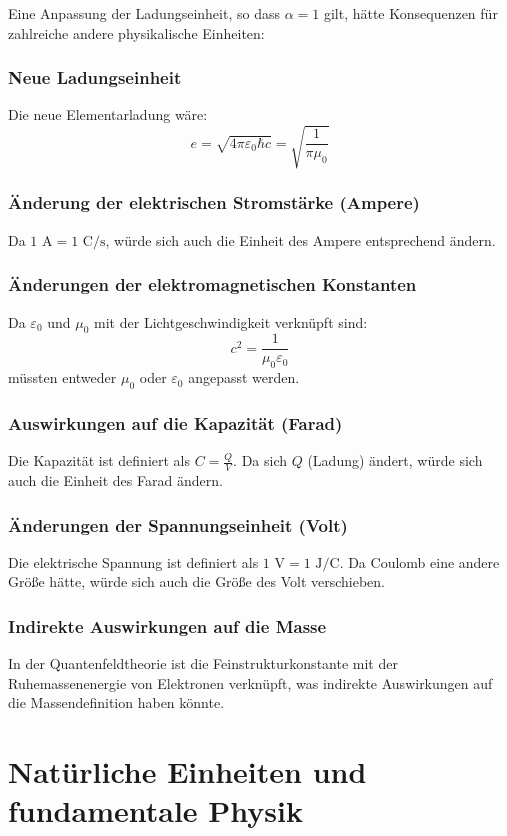 \documentclass{article}
\begin{document}
	Eine Anpassung der Ladungseinheit, so dass $\alpha = 1$ gilt, hätte Konsequenzen für zahlreiche andere physikalische Einheiten:
	
	\subsubsection{Neue Ladungseinheit}
	Die neue Elementarladung wäre:
	$$e = \sqrt{4\pi\varepsilon_0\hbar c} = \sqrt{\frac{1}{\pi \mu_0}}$$
	
	\subsubsection{Änderung der elektrischen Stromstärke (Ampere)}
	Da $1 \text{ A} = 1 \text{ C}/\text{s}$, würde sich auch die Einheit des Ampere entsprechend ändern.
	
	\subsubsection{Änderungen der elektromagnetischen Konstanten}
	Da $\varepsilon_0$ und $\mu_0$ mit der Lichtgeschwindigkeit verknüpft sind:
	$$c^2 = \frac{1}{\mu_0\varepsilon_0}$$
	müssten entweder $\mu_0$ oder $\varepsilon_0$ angepasst werden.
	
	\subsubsection{Auswirkungen auf die Kapazität (Farad)}
	Die Kapazität ist definiert als $C = \frac{Q}{V}$. Da sich $Q$ (Ladung) ändert, würde sich auch die Einheit des Farad ändern.
	
	\subsubsection{Änderungen der Spannungseinheit (Volt)}
	Die elektrische Spannung ist definiert als $1 \text{ V} = 1 \text{ J}/\text{C}$. Da Coulomb eine andere Größe hätte, würde sich auch die Größe des Volt verschieben.
	
	\subsubsection{Indirekte Auswirkungen auf die Masse}
	In der Quantenfeldtheorie ist die Feinstrukturkonstante mit der Ruhemassenenergie von Elektronen verknüpft, was indirekte Auswirkungen auf die Massendefinition haben könnte.
	
	\section{Natürliche Einheiten und fundamentale Physik}
	
\end{document}
